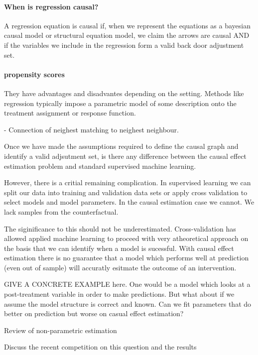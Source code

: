 \documentclass[11pt,a4paper,oneside]{book}
\begin{document}
\paragraph*{When is regression causal?}
A regression equation is causal if, when we represent the equations as a bayesian causal model or structural equation model, we claim the arrows are causal AND if the variables we include in the regression form a valid back door adjustment set. 


\paragraph*{propensity scores}

They have advantages and disadvantes depending on the setting. Methods like regression typically impose a parametric model of some description onto the treatment assignment or response function. 

- Connection of neighest matching to neighest neighbour. 

Once we have made the assumptions required to define the causal graph and identify a valid adjsutment set, is there any difference between the causal effect estimation problem and standard supervised machine learning. 

\cite{causal estimation is covariate shift}

However, there is a critial remaining complication. In supervised learning we can split our data into training and validation data sets or apply cross validation to select models and model parameters. In the causal estimation case we cannot. We lack samples from the counterfactual. 

The siginificance to this should not be underestimated. Cross-validation has allowed applied machine learning to proceed with very atheoretical approach on the basis that we can identify when a model is sucessful. With causal effect estimation there is no guarantee that a model which performs well at prediction (even out of sample) will accuratly esitmate the outcome of an intervention. 

GIVE A CONCRETE EXAMPLE here. One would be a model which looks at a post-treatment variable in order to make predictions. But what about if we assume the model structure is correct and known.  Can we fit parameters that do better on prediction but worse on casual effect estimation?

\cite{Imbens2004} Review of non-parametric estimation

Discuss the recent competition on this question and the results
\end{document}
